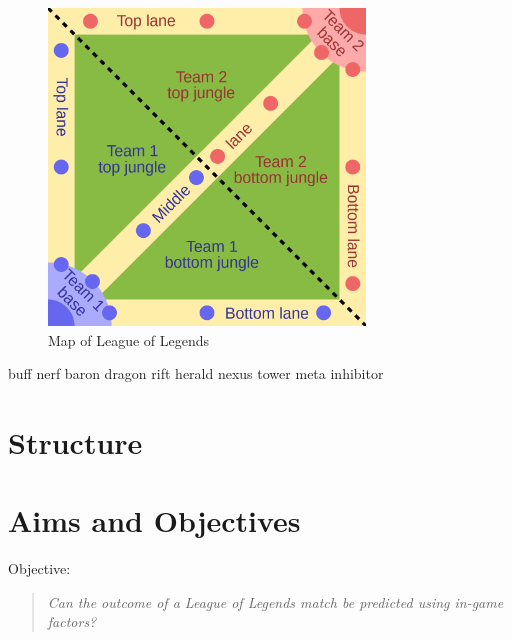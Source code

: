 \begin{figure}[h]
    \centering
    \includegraphics[width=0.75\textwidth]{figures/MOBAMap}
    \caption{Map of League of Legends}
    \label{fig:Lolmap}
\end{figure}


\gls{buff} \gls{nerf}  \gls{baron} \gls{dragon} \gls{rift herald} \gls{nexus} \gls{tower} \gls{meta} \gls{inhibitor}



\section{Structure}\label{sec:Structure}
\lipsum[1-5]

\section{Aims and Objectives}\label{sec:Aims and Objectives}

Objective: \begin{quote}  \emph{Can the outcome of a League of Legends match be predicted using in-game factors?} \end{quote}